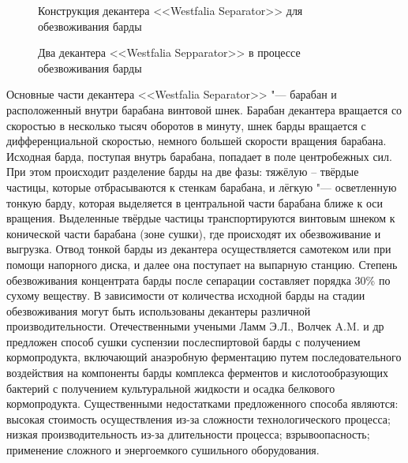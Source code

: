 {\begin{figure}
\centering 
\begin{small} 
\def\svgwidth{0.8\linewidth} 
 
\end{small} 
\caption{Конструкция декантера <<Westfalia Separator>> для обезвоживания барды} 
\label{Decan} 
\end{figure} 

\begin{figure}[h!] 
\caption{ Два декантера <<Westfalia Sepparator>> в процессе обезвоживания барды} 
\label{DublDec} 
\end{figure} 

Основные части декантера <<Westfalia Separator>> "--- барабан и расположенный внутри барабана винтовой шнек. 
Барабан декантера вращается со скоростью в несколько тысяч оборотов в минуту, шнек барды вращается с дифференциальной скоростью, немного большей скорости вращения барабана. 
Исходная барда, поступая внутрь барабана, попадает в поле центробежных сил. 
При этом происходит разделение барды на две фазы: тяжёлую -- твёрдые частицы, которые отбрасываются к стенкам барабана, и лёгкую "--- осветленную тонкую барду, которая выделяется в центральной части барабана ближе к оси вращения. 
Выделенные твёрдые частицы транспортируются винтовым шнеком к конической части барабана (зоне сушки), где происходят их обезвоживание и выгрузка. 
Отвод тонкой барды из декантера осуществляется самотеком или при помощи напорного диска, и далее она поступает на выпарную станцию. 
Степень обезвоживания концентрата барды после сепарации составляет порядка 30\% по сухому веществу. В зависимости от количества исходной барды на стадии обезвоживания могут быть использованы декантеры различной производительности. 
Отечественными учеными Ламм Э.Л., Волчек A.M. и др \cite{Patent_2128688} предложен способ сушки суспензии послеспиртовой барды с получением кормопродукта, включающий анаэробную ферментацию путем последовательного воздействия на компоненты барды комплекса ферментов и кислотообразующих бактерий с получением культуральной жидкости и осадка белкового кормопродукта. 
Существенными недостатками предложенного способа являются: высокая стоимость осуществления из-за сложности технологического процесса; низкая производительность из-за длительности процесса; взрывоопасность; применение сложного и энергоемкого сушильного оборудования. 
}
